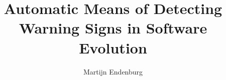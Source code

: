 \documentclass{uvamscse}
\title{Automatic Means of Detecting Warning Signs in Software Evolution}
\author{Martijn Endenburg}
\begin{document}
\maketitle

%










{}


%
\end{document}
